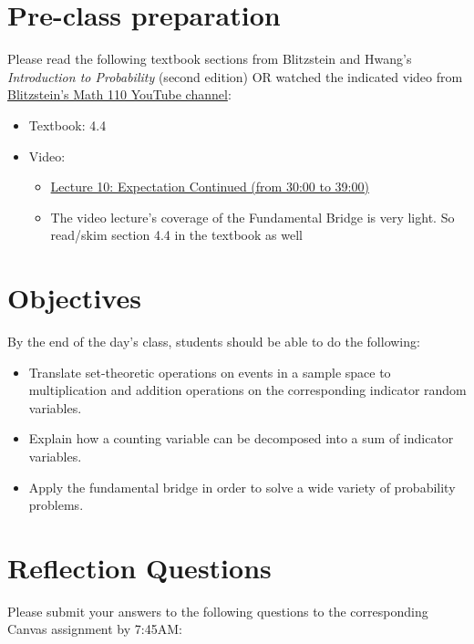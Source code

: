 \documentclass[12pt]{article}   	%
\begin{document}
\section*{Pre-class preparation}
Please read the following textbook sections from Blitzstein and Hwang's \emph{Introduction to Probability} (second edition) OR watched the indicated video from \href{https://www.youtube.com/playlist?list=PLLVplP8OIVc8EktkrD3Q8td0GmId7DjW0}{Blitzstein’s Math 110 YouTube channel}:
\begin{itemize}
	\item Textbook: 4.4
	\item Video:
		\begin{itemize}
			\item \href{https://www.youtube.com/watch?v=P1fSFvhPf7Q&list=PLLVplP8OIVc8EktkrD3Q8td0GmId7DjW0&index=11}{Lecture 10: Expectation Continued (from 30:00 to 39:00)}
			\item The video lecture’s coverage of the Fundamental Bridge is very light. So read/skim section 4.4 in the textbook as well
		\end{itemize}
\end{itemize}

\section*{Objectives}
By the end of the day's class, students should be able to do the following:

\begin{itemize}
	\item Translate set-theoretic operations on events in a sample space to multiplication and addition operations
on the corresponding indicator random variables.
	\item Explain how a counting variable can be decomposed into a sum of indicator variables.
	\item Apply the fundamental bridge in order to solve a wide variety of probability problems.
	\end{itemize}

\section*{Reflection Questions}
Please submit your answers to the following questions to the corresponding Canvas assignment by 7:45AM:
\end{document}
